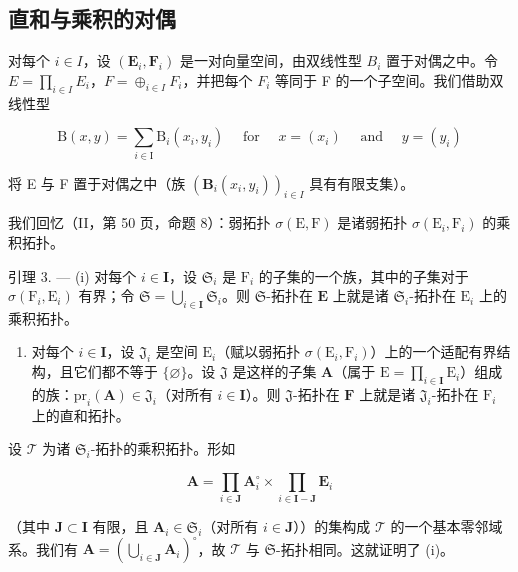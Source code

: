\subsection{直和与乘积的对偶}

对每个 \(i \in I\)，设 \((\mathbf{E}_{i}, \mathbf{F}_{i})\) 是一对向量空间，由双线性型 \(B_{i}\) 置于对偶之中。令 \(E = \prod_{i \in I} E_{i}\)，\(F = \oplus_{i \in I} F_{i}\)，并把每个 \(F_{i}\) 等同于 F 的一个子空间。我们借助双线性型

\[
\mathrm{B} (x, y) = \sum_ {i \in \mathrm{I}} \mathrm{B} _ {i} \left(x _ {i}, y _ {i}\right) \quad \text { for } \quad x = \left(x _ {i}\right) \quad \text { and } \quad y = \left(y _ {i}\right)\tag{8}
\]

将 E 与 F 置于对偶之中（族 \((\mathbf{B}_i(x_i, y_i))_{i \in I}\) 具有有限支集）。

我们回忆（II，第 50 页，命题 8）：弱拓扑 \(\sigma(\mathrm{E},\mathrm{F})\) 是诸弱拓扑 \(\sigma(\mathrm{E}_i,\mathrm{F}_i)\) 的乘积拓扑。

引理 3. --- (i) 对每个 \(i \in \mathbf{I}\)，设 \(\mathfrak{S}_i\) 是 \(\mathrm{F}_i\) 的子集的一个族，其中的子集对于 \(\sigma(\mathrm{F}_i, \mathrm{E}_i)\) 有界；令 \(\mathfrak{S} = \bigcup_{i \in \mathbf{I}} \mathfrak{S}_i\)。则 \(\mathfrak{S}\)-拓扑在 \(\mathbf{E}\) 上就是诸 \(\mathfrak{S}_i\)-拓扑在 \(\mathrm{E}_i\) 上的乘积拓扑。

\begin{enumerate}
\def\labelenumi{(\roman{enumi})}
\setcounter{enumi}{1}
\tightlist
\item
  对每个 \(i \in \mathbf{I}\)，设 \(\mathfrak{J}_i\) 是空间 \(\mathrm{E}_i\)（赋以弱拓扑 \(\sigma(\mathrm{E}_i, \mathrm{F}_i)\)）上的一个适配有界结构，且它们都不等于 \(\{\varnothing\}\)。设 \(\mathfrak{J}\) 是这样的子集 \(\mathbf{A}\)（属于 \(\mathrm{E} = \prod_{i \in \mathbf{I}} \mathrm{E}_i\)）组成的族：\(\mathrm{pr}_i(\mathbf{A}) \in \mathfrak{J}_i\)（对所有 \(i \in \mathbf{I}\)）。则 \(\mathfrak{J}\)-拓扑在 \(\mathbf{F}\) 上就是诸 \(\mathfrak{J}_i\)-拓扑在 \(\mathrm{F}_i\) 上的直和拓扑。
\end{enumerate}

设 \(\mathcal{T}\) 为诸 \(\mathfrak{S}_i\)-拓扑的乘积拓扑。形如

\[
\mathbf {A} = \prod_ {i \in \mathbf {J}} \mathbf {A} _ {i} ^ {\circ} \times \prod_ {i \in \mathbf {I} - \mathbf {J}} \mathbf {E} _ {i}
\]

（其中 \(\mathbf{J} \subset \mathbf{I}\) 有限，且 \(\mathbf{A}_i \in \mathfrak{S}_i\)（对所有 \(i \in \mathbf{J}\)））的集构成 \(\mathcal{T}\) 的一个基本零邻域系。我们有 \(\mathbf{A} = (\bigcup_{i \in \mathbf{J}} \mathbf{A}_i)^\circ\)，故 \(\mathcal{T}\) 与 \(\mathfrak{S}\)-拓扑相同。这就证明了 (i)。


